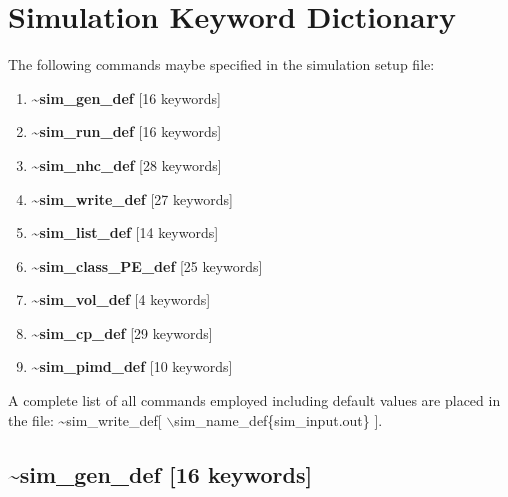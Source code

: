 \documentclass[12pt,titlepage]{article}
\begin{document}
\section{\bf Simulation Keyword Dictionary} 

The following commands maybe specified in the simulation setup file:
\begin{enumerate}
\item {\bf \~{}sim\_gen\_def} [16 keywords]
\item {\bf \~{}sim\_run\_def} [16 keywords]
\item {\bf \~{}sim\_nhc\_def} [28 keywords]
\item {\bf \~{}sim\_write\_def} [27 keywords]
\item {\bf \~{}sim\_list\_def} [14 keywords]
\item {\bf \~{}sim\_class\_PE\_def} [25 keywords]
\item {\bf \~{}sim\_vol\_def} [4 keywords]
\item {\bf \~{}sim\_cp\_def} [29 keywords]
\item {\bf \~{}sim\_pimd\_def} [10 keywords]
\end{enumerate}
A complete list of all commands employed including default
values are placed in the file:
\~{}sim\_write\_def[ $\backslash$sim\_name\_def\{sim\_input.out\} ]. 


\newpage
\subsection*{\bf \~{}sim\_gen\_def [16 keywords]}
\end{document}
